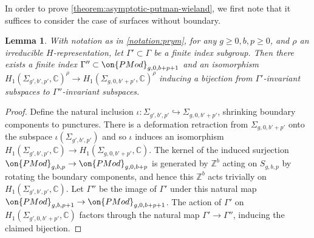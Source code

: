 \documentclass[12 pt]{amsart}
\theoremstyle{plain}
\newtheorem{lemma}[subsubsection]{Lemma}
\theoremstyle{definition}
\theoremstyle{remark}
\numberwithin{equation}{section}
\begin{document}
In order to prove \autoref{theorem:asymptotic-putman-wieland},
we first note that it suffices to consider the case of surfaces without boundary.
\begin{lemma}
	\label{lemma:ignore-boundary}
	With notation as in \autoref{notation:prym},
	for any $g \geq 0, b, p \geq 0$, 
	and $\rho$ an irreducible $H$-representation, let $\Gamma'\subset
	\Gamma$ be a finite index subgroup. Then there exists a finite index
	$\Gamma''\subset \on{PMod}_{g,0,b+p+1}$ and 
 an isomorphism	
$H_1(\Sigma_{g',b',p'}, \mathbb C)^\rho \to H_1(\Sigma_{g,0,b'+p'}, \mathbb
C)^\rho$
inducing a bijection from $\Gamma'$-invariant subspaces to
$\Gamma''$-invariant subspaces.
\end{lemma}
\begin{proof}
%
Define the natural inclusion $\iota: \Sigma_{g',b',p'} \hookrightarrow
\Sigma_{g,0,b'+p'}$,
shrinking boundary components to punctures.
There is a deformation retraction from $\Sigma_{g,0,b'+p'}$ onto the subspace
$\iota(\Sigma_{g',b',p'})$
and so $\iota$ induces an isomorphism
$H_1(\Sigma_{g',b',p'}, \mathbb C) \to H_1(\Sigma_{g,0,b'+p'}, \mathbb C).$
The kernel of the induced surjection $\on{PMod}_{g, b,p} \to \on{PMod}_{g,0,b+p}$
is generated by $\mathbb Z^b$ acting on $S_{g,b,p}$ by rotating the
boundary components,
\cite[Theorem 3.18]{farbM:a-primer}
and hence this $\mathbb Z^b$ acts trivially on 
$H_1(\Sigma_{g',b',p'}, \mathbb C)$. 
Let $\Gamma''$ be the image of $\Gamma'$ under this natural map $\on{PMod}_{g,
b,p+1} \to \on{PMod}_{g,0,b+p+1}$.
The action of $\Gamma'$ on
$H_1(\Sigma_{g',0,b'+p'}, \mathbb{C})$ factors through the natural map $\Gamma'\to \Gamma''$, inducing the claimed bijection.
\end{proof}
\end{document}
